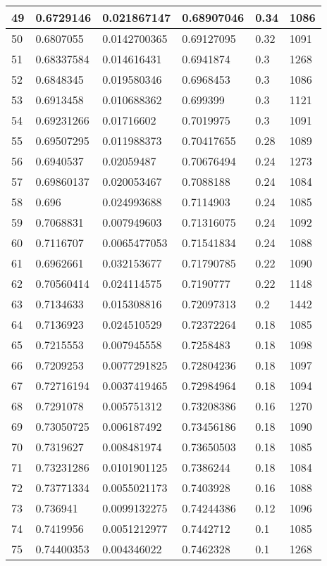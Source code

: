 \begin{longtable}{|l|l|l|l|l|l|}
49 & 0.6729146 & 0.021867147 & 0.68907046 & 0.34 & 1086 \\ \hline 
50 & 0.6807055 & 0.0142700365 & 0.69127095 & 0.32 & 1091 \\ \hline 
51 & 0.68337584 & 0.014616431 & 0.6941874 & 0.3 & 1268 \\ \hline 
52 & 0.6848345 & 0.019580346 & 0.6968453 & 0.3 & 1086 \\ \hline 
53 & 0.6913458 & 0.010688362 & 0.699399 & 0.3 & 1121 \\ \hline 
54 & 0.69231266 & 0.01716602 & 0.7019975 & 0.3 & 1091 \\ \hline 
55 & 0.69507295 & 0.011988373 & 0.70417655 & 0.28 & 1089 \\ \hline 
56 & 0.6940537 & 0.02059487 & 0.70676494 & 0.24 & 1273 \\ \hline 
57 & 0.69860137 & 0.020053467 & 0.7088188 & 0.24 & 1084 \\ \hline 
58 & 0.696 & 0.024993688 & 0.7114903 & 0.24 & 1085 \\ \hline 
59 & 0.7068831 & 0.007949603 & 0.71316075 & 0.24 & 1092 \\ \hline 
60 & 0.7116707 & 0.0065477053 & 0.71541834 & 0.24 & 1088 \\ \hline 
61 & 0.6962661 & 0.032153677 & 0.71790785 & 0.22 & 1090 \\ \hline 
62 & 0.70560414 & 0.024114575 & 0.7190777 & 0.22 & 1148 \\ \hline 
63 & 0.7134633 & 0.015308816 & 0.72097313 & 0.2 & 1442 \\ \hline 
64 & 0.7136923 & 0.024510529 & 0.72372264 & 0.18 & 1085 \\ \hline 
65 & 0.7215553 & 0.007945558 & 0.7258483 & 0.18 & 1098 \\ \hline 
66 & 0.7209253 & 0.0077291825 & 0.72804236 & 0.18 & 1097 \\ \hline 
67 & 0.72716194 & 0.0037419465 & 0.72984964 & 0.18 & 1094 \\ \hline 
68 & 0.7291078 & 0.005751312 & 0.73208386 & 0.16 & 1270 \\ \hline 
69 & 0.73050725 & 0.006187492 & 0.73456186 & 0.18 & 1090 \\ \hline 
70 & 0.7319627 & 0.008481974 & 0.73650503 & 0.18 & 1085 \\ \hline 
71 & 0.73231286 & 0.0101901125 & 0.7386244 & 0.18 & 1084 \\ \hline 
72 & 0.73771334 & 0.0055021173 & 0.7403928 & 0.16 & 1088 \\ \hline 
73 & 0.736941 & 0.0099132275 & 0.74244386 & 0.12 & 1096 \\ \hline 
74 & 0.7419956 & 0.0051212977 & 0.7442712 & 0.1 & 1085 \\ \hline 
75 & 0.74400353 & 0.004346022 & 0.7462328 & 0.1 & 1268 \\ \hline 
\end{longtable}